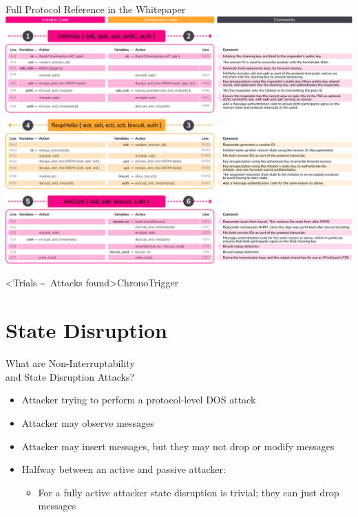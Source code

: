 \begin{frame}{Full Protocol Reference in the Whitepaper}
  \hypertarget{the-rosenpass-protocol-3}{}
  \centering
 \includegraphics[height=.90\textheight]{graphics/rosenpass-wp-message-handling-code-rgb.pdf}
\end{frame}

\interlude[2]<Trials \textasciitilde\ Attacks found>{ChronoTrigger}
\hypertarget{state-disruption}{%
\section{State Disruption}\label{state-disruption}}

\begin{frame}{What are Non-Interruptability\\and State Disruption Attacks?}
  \begin{itemize}
    \item Attacker trying to perform a protocol-level DOS attack
    \item Attacker may observe messages
    \item Attacker may insert messages, but they may not drop or modify messages
    \item Halfway between an active and passive attacker:
    \begin{itemize}
    \item For a fully active attacker state disruption is trivial; they can just drop messages
    \end{itemize}
  \end{itemize}
\end{frame}

